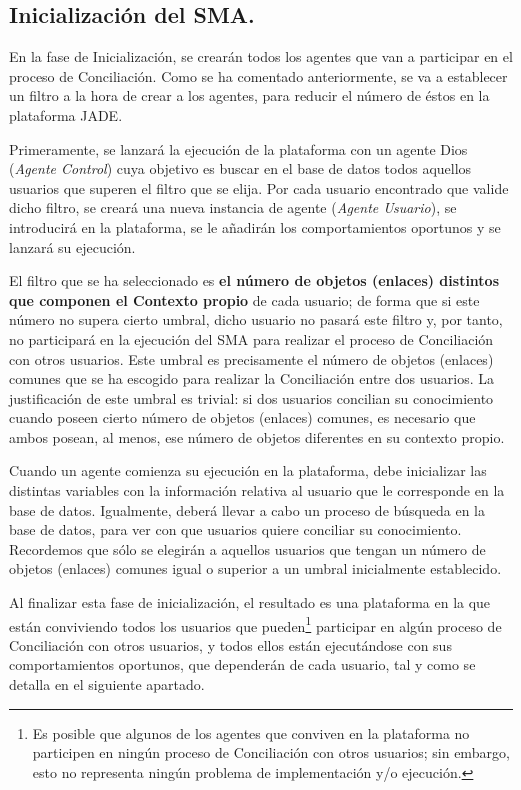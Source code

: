 \subsection{Inicialización del SMA.}

En la fase de Inicialización, se crearán todos los agentes que van a participar en el proceso de Conciliación. Como se ha comentado anteriormente, se va a establecer un filtro a la hora de crear a los agentes, para reducir el número de éstos en la plataforma JADE.

Primeramente, se lanzará la ejecución de la plataforma con un agente Dios (\emph{Agente Control}) cuya objetivo es buscar en el base de datos todos aquellos usuarios que superen el filtro que se elija. Por cada usuario encontrado que valide dicho filtro, se creará una nueva instancia de agente (\emph{Agente Usuario}), se introducirá en la plataforma, se le añadirán los comportamientos oportunos y se lanzará su ejecución.

El filtro que se ha seleccionado es {\bf el número de objetos (enlaces) distintos que componen el Contexto propio} de cada usuario; de forma que si este número no supera cierto umbral, dicho usuario no pasará este filtro y, por tanto, no participará en la ejecución del SMA para realizar el proceso de Conciliación con otros usuarios. Este umbral es precisamente el número de objetos (enlaces) comunes que se ha escogido para realizar la Conciliación entre dos usuarios. La justificación de este umbral es trivial: si dos usuarios concilian su conocimiento cuando poseen cierto número de objetos (enlaces) comunes, es necesario que ambos posean, al menos, ese número de objetos diferentes en su contexto propio.

Cuando un agente comienza su ejecución en la plataforma, debe inicializar las distintas variables con la información relativa al usuario que le corresponde en la base de datos. Igualmente, deberá llevar a cabo un proceso de búsqueda en la base de datos, para ver con que usuarios quiere conciliar su conocimiento. Recordemos que sólo se elegirán a aquellos usuarios que tengan un número de objetos (enlaces) comunes igual o superior a un umbral inicialmente establecido.

Al finalizar esta fase de inicialización, el resultado es una plataforma en la que están conviviendo todos los usuarios que pueden\footnote{Es posible que algunos de los agentes que conviven en la plataforma no participen en ningún proceso de Conciliación con otros usuarios; sin embargo, esto no representa ningún problema de implementación y/o ejecución.} participar en algún proceso de Conciliación con otros usuarios, y todos ellos están ejecutándose con sus comportamientos oportunos, que dependerán de cada usuario, tal y como se detalla en el siguiente apartado.





